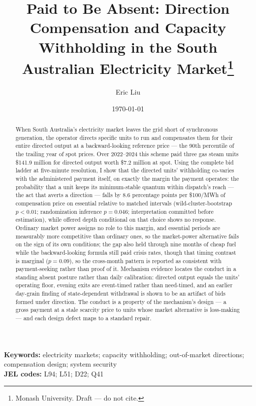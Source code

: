 \documentclass[12pt]{article}
\title{Paid to Be Absent: Direction Compensation and Capacity Withholding
in the South Australian Electricity Market\thanks{Monash University.
Draft --- do not cite.}}
\author{Eric Liu}
\date{\today}
\begin{document}
\maketitle

\begin{abstract}
\noindent
When South Australia's electricity market leaves the grid short of synchronous
generation, the operator directs specific units to run and compensates them
for their entire directed output at a backward-looking reference price --- the
90th percentile of the trailing year of spot prices. Over 2022--2024 this
scheme paid three gas steam units \$141.9 million for directed output worth
\$7.2 million at spot. Using the complete bid ladder at five-minute
resolution, I show that the directed units' withholding co-varies with the
administered payment itself, on exactly the margin the payment operates:
the probability that a unit keeps its minimum-stable quantum within
dispatch's reach --- the act that averts a direction --- falls by 8.6
percentage points per \$100/MWh of compensation price on essential relative
to matched intervals (wild-cluster-bootstrap $p<0.01$; randomization
inference $p=0.046$; interpretation committed before estimation), while
offered depth conditional on that choice shows no response. Ordinary market
power assigns no role to this margin, and essential periods are measurably
more competitive than ordinary ones, so the market-power alternative fails
on the sign of its own conditions; the gap also held through nine months of
cheap fuel while the backward-looking formula still paid crisis rates,
though that timing contrast is marginal ($p=0.09$), so the cross-month
pattern is reported as consistent with payment-seeking rather than proof of
it. Mechanism
evidence locates the conduct in a standing absent posture rather than daily
calibration: directed output equals the units' operating floor, evening
exits are event-timed rather than need-timed, and an earlier day-grain
finding of state-dependent withdrawal is shown to be an artifact of bids
formed under direction. The conduct is a property of the mechanism's design --- a gross
payment at a stale scarcity price to units whose market alternative is
loss-making --- and each design defect maps to a standard repair.
\end{abstract}

\medskip
\noindent\textbf{Keywords:} electricity markets; capacity withholding;
out-of-market directions; compensation design; system security\\
\textbf{JEL codes:} L94; L51; D22; Q41

\clearpage











\clearpage


\clearpage
\appendix



\end{document}
